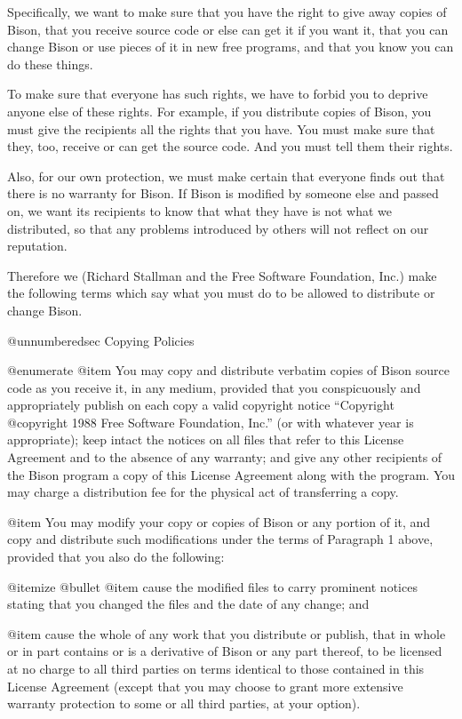 Specifically, we want to make sure that you have the right to give
away copies of Bison, that you receive source code or else can get it
if you want it, that you can change Bison or use pieces of it in new
free programs, and that you know you can do these things.

To make sure that everyone has such rights, we have to forbid you to
deprive anyone else of these rights.  For example, if you distribute
copies of Bison, you must give the recipients all the rights that you
have.  You must make sure that they, too, receive or can get the
source code.  And you must tell them their rights.

Also, for our own protection, we must make certain that everyone
finds out that there is no warranty for Bison.  If Bison is modified by
someone else and passed on, we want its recipients to know that what
they have is not what we distributed, so that any problems introduced
by others will not reflect on our reputation.

Therefore we (Richard Stallman and the Free Software Foundation,
Inc.) make the following terms which say what you must do to be
allowed to distribute or change Bison.

@unnumberedsec Copying Policies

@enumerate
@item
You may copy and distribute verbatim copies of Bison source code as
you receive it, in any medium, provided that you conspicuously and
appropriately publish on each copy a valid copyright notice
``Copyright @copyright{} 1988 Free Software Foundation, Inc.'' (or
with whatever year is appropriate); keep intact the notices on all
files that refer to this License Agreement and to the absence of any
warranty; and give any other recipients of the Bison program a copy
of this License Agreement along with the program.  You may charge a
distribution fee for the physical act of transferring a copy.

@item
You may modify your copy or copies of Bison or any portion of it,
and copy and distribute such modifications under the terms of
Paragraph 1 above, provided that you also do the following:

@itemize @bullet
@item
cause the modified files to carry prominent notices stating
that you changed the files and the date of any change; and

@item
cause the whole of any work that you distribute or publish, that
in whole or in part contains or is a derivative of Bison or any
part thereof, to be licensed at no charge to all third parties on
terms identical to those contained in this License Agreement
(except that you may choose to grant more extensive warranty
protection to some or all third parties, at your option).


